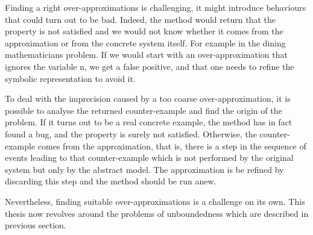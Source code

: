 Finding a right over-approximations is challenging, it might introduce
behaviours that could turn out to be bad. Indeed, the method would
return that the property is not satisfied and we would not know
whether it comes from the approximation or from the concrete system
itself.
For example in the dining mathematicians problem. If we would start with an over-approximation that ignores the variable n, we get a false
  positive, and that one needs to refine the symbolic representation to
  avoid it.

To deal with the imprecision caused by a too coarse
over-approximation, it is possible to analyse the returned
counter-example and find the origin of the problem. If it turns out to
be a real concrete example, the method has in fact found a bug, and
the property is surely not satisfied. Otherwise, the counter-example
comes from the approximation, that is, there is a step in the sequence
of events leading to that counter-example which is not performed by
the original system but only by the abstract model. The approximation
is be refined by discarding this step and the method should be run
anew.

Nevertheless, finding suitable over-approximations is a challenge on
its own. %
This thesis now revolves around the problems of unboundedness which are described in previous section.

